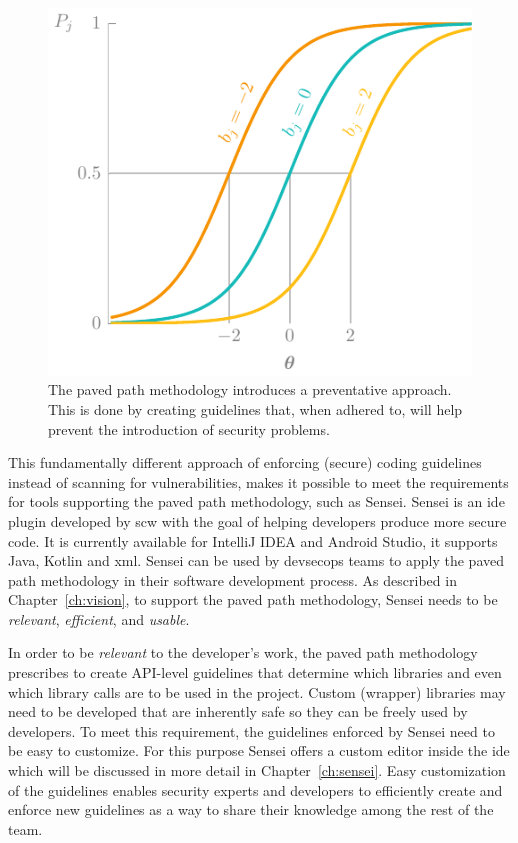 \begin{figure}
    \centering
    \includegraphics[page=14]{03-education/figures/tikzfigures.pdf}
  \caption[Paved path methodology]{The paved path methodology introduces a preventative approach. This is done by creating guidelines that, when adhered to, will help prevent the introduction of security problems.}
  \label{fig:pavedpath} 
\end{figure}

This fundamentally different approach of enforcing (secure) coding guidelines instead of scanning for vulnerabilities, makes it possible to meet the requirements for tools supporting the paved path methodology, such as Sensei.
Sensei is an \gls{ide} plugin developed by \gls{scw} with the goal of helping developers produce more secure code.
It is currently available for IntelliJ IDEA and Android Studio, it supports Java, Kotlin and \gls{xml}.
Sensei can be used by \gls{devsecops} teams to apply the paved path methodology in their software development process.
As described in Chapter~\ref{ch:vision}, to support the paved path methodology, Sensei needs to be \textit{relevant}, \textit{efficient}, and \textit{usable}.

In order to be \textit{relevant} to the developer's work, the paved path methodology prescribes to create API-level guidelines that determine which libraries and even which library calls are to be used in the project.
Custom (wrapper) libraries may need to be developed that are inherently safe so they can be freely used by developers.
To meet this requirement, the guidelines enforced by Sensei need to be easy to customize.
For this purpose Sensei offers a custom editor inside the \gls{ide} which will be discussed in more detail in Chapter~\ref{ch:sensei}.
Easy customization of the guidelines enables security experts and developers to efficiently create and enforce new guidelines as a way to share their knowledge among the rest of the team.


